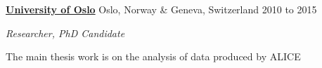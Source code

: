 \documentclass[11pt]{article}
\newenvironment{outerlist}[1][\enskip\textbullet]%
        {\begin{itemize}[#1]}{\end{itemize}%
         \vspace{-.6\baselineskip}}
\newenvironment{innerlist}[1][\enskip\textbullet]%
        {\begin{compactitem}[#1]}{\end{compactitem}}
\newcommand{\blankline}{\quad\pagebreak[2]}
\begin{document}
\href{http://www.uib.no/en}{\textbf{University of Oslo}}
Oslo, Norway \& Geneva, Switzerland
\hfill 2010 to 2015
\begin{outerlist}
\item[] \textit{Researcher, PhD Candidate}
  \begin{innerlist}
    \footnotesize
  \item The main thesis work is on the analysis of data produced by ALICE
  \end{innerlist}
\end{outerlist}

\blankline
\end{document}
